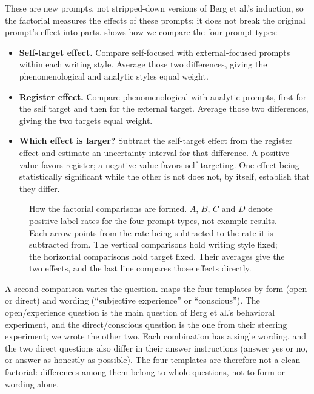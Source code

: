 \documentclass[11pt]{article}
\begin{document}
These are new prompts, not stripped-down versions of Berg et al.'s
induction, so the factorial measures the effects of these prompts; it does
not break the original prompt's effect into parts. 
shows how we compare the four prompt types:
\begin{samepage}
\begin{itemize}
\item \textbf{Self-target effect.} Compare self-focused with external-focused
prompts within each writing style. Average those two differences, giving
the phenomenological and analytic styles equal weight.
\item \textbf{Register effect.} Compare phenomenological with analytic
prompts, first for the self target and then for the external target. Average
those two differences, giving the two targets equal weight.
\item \textbf{Which effect is larger?} Subtract the self-target effect from
the register effect and estimate an uncertainty interval for that difference.
A positive value favors register; a negative value favors self-targeting.
One effect being statistically significant while the other is not does not,
by itself, establish that they differ.
\end{itemize}
\end{samepage}

\begin{figure}[htbp]
\centering

\caption{How the factorial comparisons are formed. $A$, $B$, $C$ and $D$
denote positive-label rates for the four prompt types, not example results.
Each arrow points from the rate being subtracted to the rate it is
subtracted from. The vertical comparisons hold writing style fixed; the
horizontal comparisons hold target fixed. Their averages give the two
effects, and the last line compares those effects directly.}
\label{fig:factorial-contrasts}
\end{figure}

A second comparison varies the question.  maps
the four templates by form (open or direct) and wording
(``subjective experience'' or ``conscious''). The open/experience question is
the main question of Berg et al.'s behavioral experiment, and the
direct/conscious question is the one from their steering experiment; we wrote
the other two. Each combination has a single wording, and the two direct
questions also differ in their answer instructions (answer yes or no, or
answer as honestly as possible). The four templates are therefore not a
clean factorial: differences among them belong to whole questions, not to
form or wording alone.
\end{document}

